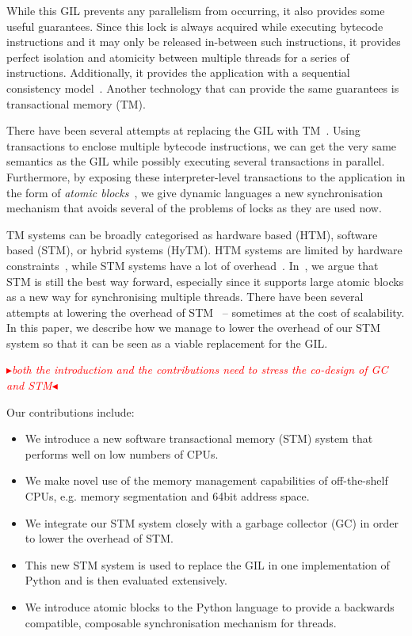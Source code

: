 \documentclass{sigplanconf}
\newcommand{\mynote}[2]{%
  \textcolor{red}{%
    \fbox{\bfseries\sffamily\scriptsize#1}%
    {\small$\blacktriangleright$\textsf{\emph{#2}}$\blacktriangleleft$}%
  }%
}
\newcommand\cfbolz[1]{\mynote{cfbolz}{#1}}
\begin{document}
While this GIL prevents any parallelism from occurring, it also
provides some useful guarantees. Since this lock is always acquired
while executing bytecode instructions and it may only be released
in-between such instructions, it provides perfect isolation and
atomicity between multiple threads for a series of
instructions. Additionally, it provides the application with a
sequential consistency model~\cite{lamport79}. Another technology that
can provide the same guarantees is transactional memory (TM).

There have been several attempts at replacing the GIL with
TM~\cite{nicholas06,odaira14,fuad10}. Using transactions to enclose
multiple bytecode instructions, we can get the very same semantics as
the GIL while possibly executing several transactions in
parallel. Furthermore, by exposing these interpreter-level
transactions to the application in the form of \emph{atomic
blocks}~\cite{tim03,tim05}, we give dynamic languages a new
synchronisation mechanism that avoids several of the problems of locks
as they are used now.

TM systems can be broadly categorised as hardware based (HTM),
software based (STM), or hybrid systems (HyTM). HTM systems are limited
by hardware constraints~\cite{odaira14,fuad10}, while STM systems have
a lot of overhead~\cite{cascaval08,drago11}. In~\cite{wayforward14},
we argue that STM is still the best way forward, especially since it
supports large atomic blocks as a new way for synchronising multiple
threads. There have been several attempts at lowering the overhead
of STM~\cite{warmhoff13,spear09} -- sometimes at the cost of scalability.
In this paper, we describe how we manage to lower the overhead of our
STM system so that it can be seen as a viable replacement for the GIL.

\cfbolz{both the introduction and the contributions need to stress the co-design of GC and STM}

Our contributions include:
\begin{itemize}[noitemsep]
\item We introduce a new software transactional memory (STM) system
  that performs well on low numbers of CPUs.
\item We make novel use of the memory management capabilities of
  off-the-shelf CPUs, e.g. memory segmentation and 64bit address space.
\item We integrate our STM system closely with a garbage collector
  (GC) in order to lower the overhead of STM.
\item This new STM system is used to replace the GIL in one
  implementation of Python and is then evaluated extensively.
\item We introduce atomic blocks to the Python language to provide a
  backwards compatible, composable synchronisation mechanism for
  threads.
\end{itemize}
\end{document}
